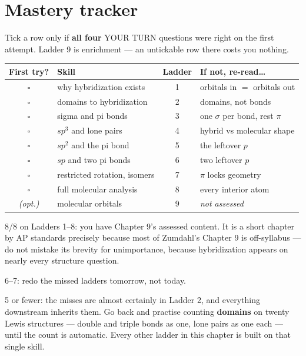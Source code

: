 \documentclass{apchem-worksheet}
\begin{document}
\section*{\sffamily Mastery tracker}

Tick a row only if \textbf{all four} YOUR TURN questions were right on
the first attempt. Ladder 9 is enrichment --- an untickable row there
costs you nothing.

\renewcommand{\arraystretch}{1.35}
\noindent\begin{tabular}{@{}c p{6.2cm} c p{4.8cm}@{}}
\toprule
\textbf{First try?} & \textbf{Skill} & \textbf{Ladder} &
  \textbf{If not, re-read\ldots}\\
\midrule
$\square$ & why hybridization exists & 1 & orbitals in $=$ orbitals out \\
$\square$ & domains to hybridization & 2 & domains, not bonds \\
$\square$ & sigma and pi bonds & 3 & one $\sigma$ per bond, rest $\pi$ \\
$\square$ & $sp^{3}$ and lone pairs & 4 & hybrid vs molecular shape \\
$\square$ & $sp^{2}$ and the pi bond & 5 & the leftover $p$ \\
$\square$ & $sp$ and two pi bonds & 6 & two leftover $p$ \\
$\square$ & restricted rotation, isomers & 7 & $\pi$ locks geometry \\
$\square$ & full molecular analysis & 8 & every interior atom \\
\midrule
\textit{(opt.)} & molecular orbitals & 9 & \textit{not assessed} \\
\bottomrule
\end{tabular}

\begin{apcnote}
8/8 on Ladders 1--8: you have Chapter 9's assessed content. It is a
short chapter by AP standards precisely because most of Zumdahl's
Chapter 9 is off-syllabus --- do not mistake its brevity for
unimportance, because hybridization appears on nearly every structure
question.

6--7: redo the missed ladders tomorrow, not today.

5 or fewer: the misses are almost certainly in Ladder 2, and everything
downstream inherits them. Go back and practise counting
\textbf{domains} on twenty Lewis structures --- double and triple bonds
as one, lone pairs as one each --- until the count is automatic. Every
other ladder in this chapter is built on that single skill.
\end{apcnote}
\end{document}
